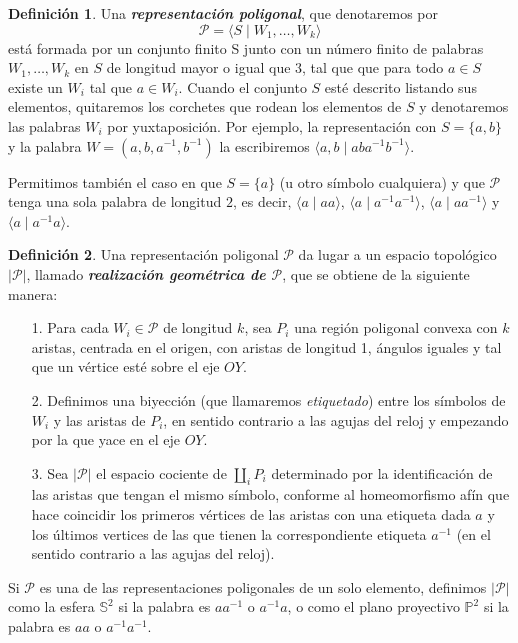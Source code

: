 \documentclass[10pt]{report}
\theoremstyle{definition}
\newtheorem{defin}{Definición}[section]
\begin{document}
\begin{defin}%
\label{def:rep_pol}
Una \textbf{\textit{representación poligonal}}, que denotaremos por $$\mathcal{P}=\langle S\mid W_1,\dots ,W_k\rangle$$ está formada por un conjunto finito S junto con un número finito de palabras $W_1,\dots ,W_k$ en $S$ de longitud mayor o igual que $3$, tal que que para todo $a\in S$ existe un $W_i$ tal que $a\in W_i$. Cuando el conjunto $S$ esté descrito listando sus elementos, quitaremos los corchetes que rodean los elementos de $S$ y denotaremos las palabras $W_i$ por yuxtaposición. Por ejemplo, la representación con $S=\{a,b\}$ y la palabra $W=(a,b,a^{-1},b^{-1})$ la escribiremos $\langle a,b\mid  aba^{-1}b^{-1}\rangle$. 

Permitimos también el caso en que $S=\{a\}$ (u otro símbolo cualquiera) y que $\mathcal{P}$ tenga una sola palabra de longitud $2$, es decir, $\langle a\mid aa\rangle$, $\langle a\mid a^{-1}a^{-1}\rangle$, $\langle a\mid aa^{-1}\rangle$ y $\langle a\mid a^{-1}a\rangle$.

\end{defin}

\begin{defin}%
Una representación poligonal $\mathcal{P}$ da lugar a un espacio topológico $|\mathcal{P}|$, llamado \textbf{\textit{realización geométrica de $\mathcal{P}$}}, que se obtiene de la siguiente manera:
\begin{itemize}
\item[1.] Para cada $W_i\in \mathcal{P}$ de longitud $k$, sea $P_i$ una región poligonal convexa con $k$ aristas, centrada en el origen, con aristas de longitud 1, ángulos iguales y tal que un vértice esté sobre el eje $OY$.
\item[2.] Definimos una biyección (que llamaremos \textit{etiquetado}) entre los símbolos de $W_ i$ y las aristas de $P_i$, en sentido contrario a las agujas del reloj y empezando por la que yace en el eje $OY$.
\item[3.] Sea $|\mathcal{P}|$ el espacio cociente de $\coprod_i P_i$ determinado por la identificación de las aristas que tengan el mismo símbolo, conforme al homeomorfismo afín que hace coincidir los primeros vértices de las aristas con una etiqueta dada $a$ y los últimos vertices de las que tienen la correspondiente etiqueta $a^{-1}$ (en el sentido contrario a las agujas del reloj).

\end{itemize}


Si $\mathcal{P}$ es una de las representaciones poligonales de un solo elemento, definimos $|\mathcal{P}|$ como la esfera $\mathbb{S}^2$ si la palabra es $aa^{-1}$ o $a^{-1}a$, o como el plano proyectivo $\mathbb{P}^2$ si la palabra es $aa$ o $a^{-1}a^{-1}$.%
\end{defin}
\end{document}
